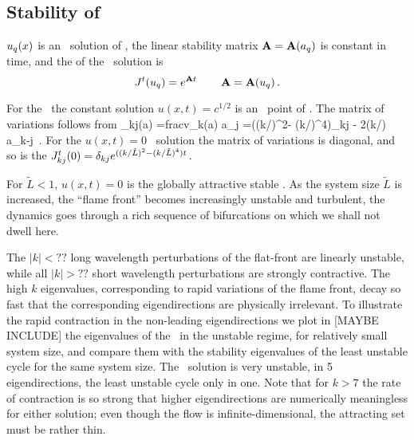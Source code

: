 \subsection{Stability of \eqva}
\label{s:StabEqui}


$u_q(x)$ is an \eqv\ solution of \KSe,
the linear stability matrix
${\bf A}={\bf A}(a_q)$
is constant in time,
and  
the {\jacobianM}
of the \eqv\ solution is
\[
 {J}^t(u_q) = e^{{\bf A} t}
    \,\qquad
 {\bf \ensuremath{A}}={\bf A}(u_q)
\,.
\]

For the \KSe\ the constant solution $u(x,t)= c^{1/2}$ is an 
\eqv\ point of . The matrix of variations
follows from 
\beq
{\Mvar}_{kj}(a) =frac{\pde v_k(a)}{ \pde a_j  }
=((k/)^2- (k/)^4)\delta_{kj} - 2(k/) a_{k-j}
\,.
For the $u(x,t)=0$ \eqv\  solution the matrix of variations
is diagonal, and 
so is the {\jacobianM}
$
{J}^t_{kj}(0) = \delta_{kj} e^{((k/\tilde{L})^2- (k/\tilde{L})^4)t}
\,.
$

For $\tilde{L} < 1$,  $u(x,t)=0$ is the globally attractive stable 
{\eqv}.
As the system size $\tilde{L}$  is increased,
the ``flame front'' becomes increasingly unstable and turbulent,
the dynamics goes through a rich sequence of
bifurcations on which we shall not dwell here.

The $|k|<??$ 
long wavelength perturbations of the flat-front {\eqv}
are linearly unstable, while all 
$|k|> ??$ short wavelength perturbations are strongly contractive.  
The high $k$ eigenvalues, corresponding to rapid variations of
the flame front, decay so fast that the corresponding eigendirections
are physically irrelevant.
To illustrate the rapid contraction in the non-leading eigendirections
we plot  in [MAYBE INCLUDE] %
the eigenvalues of the \eqv\ in the unstable regime,
for relatively small system size, %
and compare them with the
stability eigenvalues of the least unstable cycle for the same 
system size.
The \eqv\ solution is very unstable,
in 5 eigendirections,
the least unstable cycle only in one. 
Note that for $k>7$ the rate of contraction
is so strong that higher eigendirections are numerically meaningless for 
either solution; even though the flow is infinite-dimensional, the attracting
set must be rather thin.

